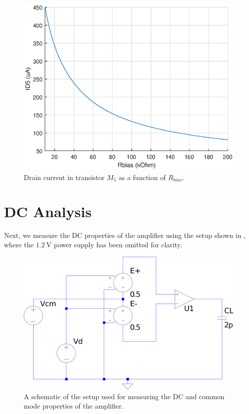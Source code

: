 \documentclass[journal,hidelinks]{IEEEtran}
\begin{document}
\begin{figure}[!htb]
  \centering
  \includegraphics[width=\columnwidth]{rsweep.eps}
  \caption{Drain current in transistor $M_5$ as a function of $R_{bias}$.}
  \label{fig:rsweep}
\end{figure}

\section{DC Analysis}

Next, we measure the DC properties of the amplifier using the setup shown in , where the $\SI{1.2}{\volt}$ power supply has been omitted for clarity.

\begin{figure}[!htb]
  \centering
  \includegraphics[width=\columnwidth]{dc_setup.pdf}
  \caption{A schematic of the setup used for measuring the DC and common mode properties of the amplifier.}
  \label{fig:dc_setup}
\end{figure}
\end{document}
